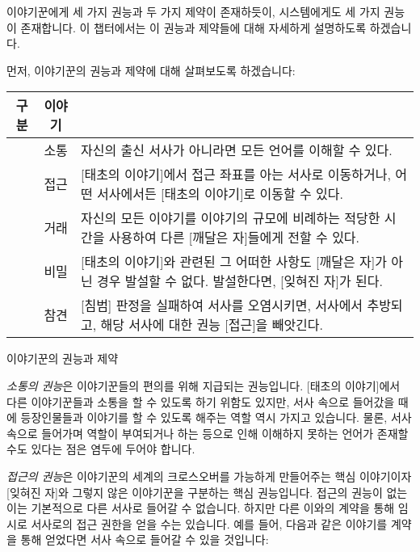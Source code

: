\documentclass{report}
\begin{document}
	이야기꾼에게 세 가지 권능과 두 가지 제약이 존재하듯이, 시스템에게도 세 가지 권능이 존재합니다. 이 챕터에서는 이 권능과 제약들에 대해 자세하게 설명하도록 하겠습니다.
	
	\bigskip
	
	먼저, 이야기꾼의 권능과 제약에 대해 살펴보도록 하겠습니다:
	
	\smallskip
	
	\begin{minipage}{\textwidth}
		\begin{tabularx}{\textwidth}{c|c|X}
			\hline
			\textbf{구분} & \textbf{이야기} & \makecell{\centering\textbf{설명}} \\ \hline \hline
			[권능] & 소통\index{소통} & 자신의 출신 서사가 아니라면 모든 언어를 이해할 수 있다. \\ \hline
			[권능] & 접근\index{접근} & [태초의 이야기]에서 접근 좌표를 아는 서사로 이동하거나, 어떤 서사에서든 [태초의 이야기]로 이동할 수 있다. \\ \hline
			[권능] & 거래\index{거래} & 자신의 모든 이야기를 이야기의 규모에 비례하는 적당한 시간을 사용하여 다른 [깨달은 자]들에게 전할 수 있다. \\ \hline
			[제약] & 비밀\index{비밀} & [태초의 이야기]와 관련된 그 어떠한 사항도 [깨달은 자]가 아닌 경우 발설할 수 없다. 발설한다면, [잊혀진 자]가 된다. \\ \hline
			[제약] & 참견\index{참견} & [침범] 판정을 실패하여 서사를 오염시키면, 서사에서 추방되고, 해당 서사에 대한 권능 [접근]을 빼앗긴다. \\\hline
		\end{tabularx}
		
		\smallskip
		
		\begin{tightcenter}
			이야기꾼의 권능과 제약
		\end{tightcenter}
	\end{minipage}
	
	\bigskip
	
	\emph{소통의 권능}은 이야기꾼들의 편의를 위해 지급되는 권능입니다. [태초의 이야기]에서 다른 이야기꾼들과 소통을 할 수 있도록 하기 위함도 있지만, 서사 속으로 들어갔을 때에 등장인물들과 이야기를 할 수 있도록 해주는 역할 역시 가지고 있습니다. 물론, 서사 속으로 들어가며 역할이 부여되거나 하는 등으로 인해 이해하지 못하는 언어가 존재할 수도 있다는 점은 염두에 두어야 합니다.
	
	\smallskip
	
	\emph{접근의 권능}은 이야기꾼의 세계의 크로스오버를 가능하게 만들어주는 핵심 이야기이자 [잊혀진 자]와 그렇지 않은 이야기꾼을 구분하는 핵심 권능입니다. 접근의 권능이 없는 이는 기본적으로 다른 서사로 들어갈 수 없습니다. 하지만 다른 이와의 계약을 통해 임시로 서사로의 접근 권한을 얻을 수는 있습니다. 예를 들어, 다음과 같은 이야기를 계약을 통해 얻었다면 서사 속으로 들어갈 수 있을 것입니다:
	
\end{document}
